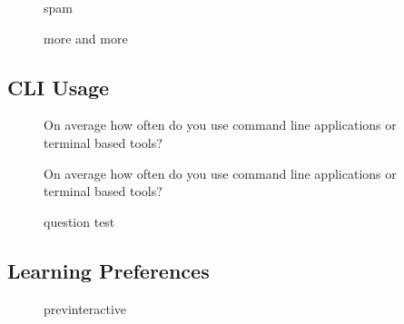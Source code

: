 \begin{figure}[htbp]
	\scalebox{0.72}{}
	\caption{spam}
	\label{fig:uniexp}
\end{figure}

\begin{figure}[htbp]
	\scalebox{0.72}{}
	\caption{more and more}
	\label{fig:moreandmore}
\end{figure}


\FloatBarrier

\subsection{CLI Usage}

\begin{figure}[htbp]
	\centering
	\scalebox{0.67}{}
	\caption{On average how often do you use command line applications or terminal based tools?}
	\label{fig:question}
\end{figure}

\begin{figure}[htbp]
	\centering
	\scalebox{0.67}{}
	\caption{On average how often do you use command line applications or terminal based tools?}
	\label{fig:question}
\end{figure}


\begin{figure}[htbp]
	\scalebox{0.72}{}
	\caption{question test}
	\label{fig:question}
\end{figure}


\FloatBarrier
\subsection{Learning Preferences}

\begin{figure}[htbp]
	\centering
	\scalebox{0.72}{}
	\caption{previnteractive}
	\label{fig:previnteractive}
\end{figure}
